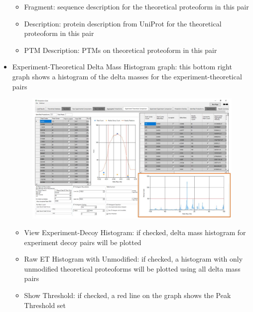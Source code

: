 \begin{itemize}
\begin{itemize}
	\item Fragment: sequence description for the theoretical proteoform in this pair
	\item Description: protein description from UniProt for the theoretical proteoform in this pair
	\item PTM Description: PTMs on theoretical proteoform in this pair
\end{itemize}
\pagebreak
\item Experiment-Theoretical Delta Mass Histogram graph: this bottom right graph shows a histogram of the delta masses for the experiment-theoretical pairs
\begin{figure}[h]
\centering
\includegraphics[scale=0.46]{figures/et5.jpg}
\end{figure}
\begin{itemize} 
	\item View Experiment-Decoy Histogram: if checked, delta mass histogram for experiment decoy pairs will be plotted
	\item Raw ET Histogram with Unmodified: if checked, a histogram with only unmodified theoretical proteoforms will be plotted using all delta mass pairs
	\item Show Threshold: if checked, a red line on the graph shows the Peak Threshold set
	\end{itemize}
\end{itemize}